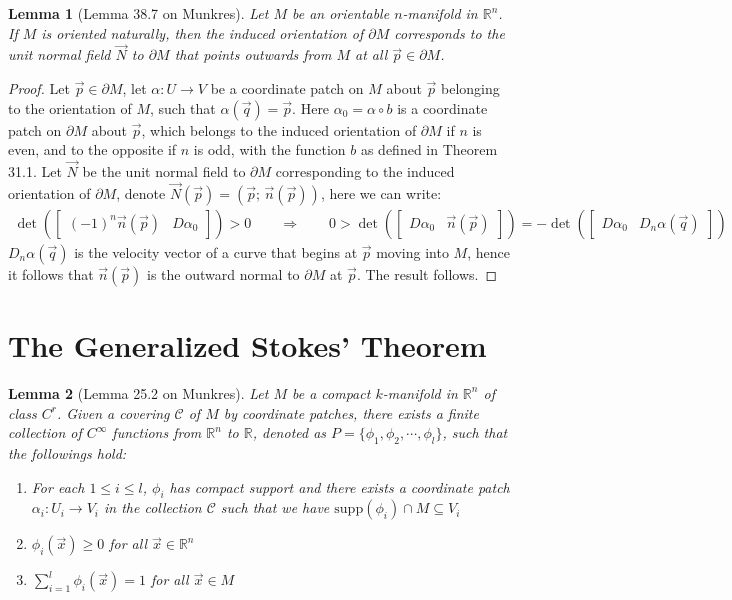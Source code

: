 \documentclass[11pt,oneside]{book}
\theoremstyle{break}
\theoremstyle{break}
\newtheorem{lem}{Lemma}[thm]
\newcommand{\R}{\mathbb{R}}
\newcommand{\C}{\mathcal{C}}
\newcommand{\bmat}[1]{\begin{bmatrix} #1 \end{bmatrix}}
\begin{document}
\begin{lem}[Lemma 38.7 on Munkres]
Let $M$ be an orientable $n$-manifold in $\R^n$. If $M$ is oriented naturally, then the induced orientation of $\partial M$ corresponds to the unit normal field $\vec{N}$ to $\partial M$ that points outwards from $M$ at all $\vec{p}\in \partial M$. 
\end{lem}
\begin{proof}
Let $\vec{p}\in \partial M$, let $\alpha:U \to V$ be a coordinate patch on $M$ about $\vec{p}$ belonging to the orientation of $M$, such that $\alpha(\vec{q}) = \vec{p}$. Here $\alpha_0 = \alpha\circ b$ is a coordinate patch on $\partial M$ about $\vec{p}$, which belongs to the induced orientation of $\partial M$ if $n$ is even, and to the opposite if $n$ is odd, with the function $b$ as defined in Theorem 31.1. Let $\vec{N}$ be the unit normal field to $\partial M$ corresponding to the induced orientation of $\partial M$, denote $\vec{N}(\vec{p}) = (\vec{p};\,\vec{n}(\vec{p}))$, here we can write:
\begin{align*}
\det\left(\bmat{(-1)^n\vec{n}(\vec{p}) & D\alpha_0} \right) > 0\qquad\Rightarrow\qquad  0>\det\left(\bmat{D\alpha_0& \vec{n}(\vec{p})} \right)=-\det\left(\bmat{D\alpha_0& D_{n}\alpha(\vec{q})} \right)   
\end{align*}
$D_n\alpha(\vec{q})$ is the velocity vector of a curve that begins at $\vec{p}$ moving into $M$, hence it follows that $\vec{n}(\vec{p})$ is the outward normal to $\partial M$ at $\vec{p}$. The result follows.
\end{proof}

\newpage
\section[The Generalized Stokes' Theorem]{\color{red}The Generalized Stokes' Theorem\color{black}}
\begin{lem}[Lemma 25.2 on Munkres]
Let $M$ be a compact $k$-manifold in $\R^n$ of class $C^r$. Given a covering $\mathcal{C}$ of $M$ by coordinate patches, there exists a finite collection of $C^\infty$ functions from $\R^n$ to $\R$, denoted as $P = \{ \phi_1, \phi_2,\cdots, \phi_l\}$, such that the followings hold:
\begin{enumerate}[topsep=3pt,itemsep=-1ex,partopsep=1ex,parsep=1ex]
\item For each $1\leq i\leq l$, $\phi_i$ has compact support and there exists a coordinate patch $\alpha_i : U_i \to V_i$ in the collection $\C$ such that we have $\text{supp}(\phi_i) \cap M \subseteq V_i$
\item $\phi_i(\vec{x})\geq 0$ for all $\vec{x} \in \R^n$
\item $\sum_{i=1}^l \phi_i(\vec{x}) = 1$ for all $\vec{x}\in M$
\end{enumerate}
\end{lem}
\end{document}
